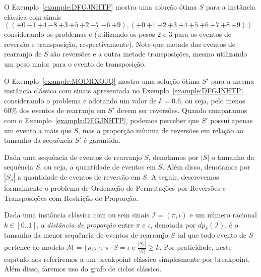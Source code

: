 O Exemplo~\ref{example:DFGJNHTP} mostra uma solução ótima $S$ para a instância clássica com sinais $(({+0}~{-1}~{+4}~{-8}~{+3}~{+5}~{+2}~{-7}~{-6}~{+9}),({+0}~{+1}~{+2}~{+3}~{+4}~{+5}~{+6}~{+7}~{+8}~{+9}))$ considerando os problemas \SbRT{} e \SbWRT{} (utilizando os pesos $2$ e $3$ para os eventos de reversão e transposição, respectivamente). Note que metade dos eventos de rearranjo de $S$ são reversões e a outra metade transposições, mesmo utilizando um peso maior para o evento de transposição.

\pagebreak


O Exemplo~\ref{example:MODRXOJQ} mostra uma solução ótima $S'$ para a mesma instância clássica com sinais apresentada no Exemplo~\ref{example:DFGJNHTP} considerando o problema \SbPRT{} e adotando um valor de $k = 0.6$, ou seja, pelo menos 60\% dos eventos de rearranjo em $S'$ devem ser reversões. Quando comparamos com o Exemplo~\ref{example:DFGJNHTP}, podemos perceber que $S'$ possui apenas um evento a mais que $S$, mas a proporção mínima de reversões em relação ao tamanho da sequência $S'$ é garantida.



Dada uma sequência de eventos de rearranjo $S$, denotamos por $|S|$ o tamanho da sequência $S$, ou seja, a quantidade de eventos em $S$. Além disso, denotamos por $|S_{\rho}|$ a quantidade de eventos de reversão em $S$. A seguir, descrevemos formalmente o problema de Ordenação de Permutações por Reversões e Transposições com Restrição de Proporção.

\begin{task}
\end{task}

Dada uma instância clássica com ou sem sinais $\mathcal{I}=(\pi,\iota)$ e um número racional $k \in [0..1]$, a \emph{distância de proporção} entre $\pi$ e $\iota$, denotada por $dp_{k}(\mathcal{I})$, é o tamanho da menor sequência de eventos de rearranjo $S$ tal que todo evento de $S$ pertence ao modelo $\mathcal{M}=\{\rho,\tau\}$, $\pi \cdot S = \iota$ e $\frac{|S_{\rho}|}{|S|} \ge k$. Por praticidade, neste capítulo nos referiremos a um breakpoint clássico simplesmente por breakpoint. Além disso, faremos uso do grafo de ciclos clássico.


